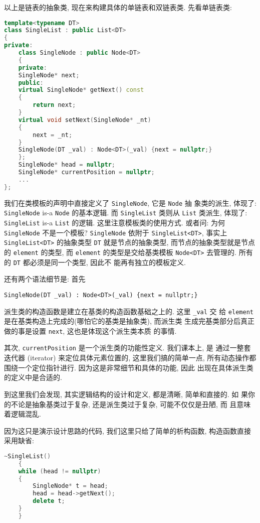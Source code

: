\documentclass[a4paper]{ctexart}
\theoremstyle{definition}
\theoremstyle{definition}
\begin{document}
以上是链表的抽象类, 现在来构建具体的单链表和双链表类. 先看单链表类:

\begin{lstlisting}[language=C++]
template<typename DT>
class SingleList : public List<DT>
{
private:
    class SingleNode : public Node<DT>
    {
    private:
	SingleNode* next;
    public:
	virtual SingleNode* getNext() const
	{
	    return next;
	}
	virtual void setNext(SingleNode* _nt)
	{
	    next = _nt;
	}
	SingleNode(DT _val) : Node<DT>(_val) {next = nullptr;}
    };
    SingleNode* head = nullptr;
    SingleNode* currentPosition = nullptr;
    ...
};
\end{lstlisting}

我们在类模板的声明中直接定义了 \verb|SingleNode|, 它是 \verb|Node| 抽
象类的派生, 体现了: \verb|SingleNode| is-a \verb|Node| 的基本逻辑. 而
\verb|SingleList| 类则从 \verb|List| 类派生, 体现了: \verb|SingleList|
is-a \verb|List| 的逻辑. 这里注意模板类的使用方式. 或者问: 为何
\verb|SingleNode| 不是一个模板? \verb|SingleNode| 依附于
\verb|SingleList<DT>|, 事实上 \verb|SingleList<DT>| 的抽象类型
\verb|DT| 就是节点的抽象类型, 而节点的抽象类型就是节点的
\verb|element| 的类型, 而 \verb|element| 的类型是交给基类模板
\verb|Node<DT>| 去管理的. 所有的 \verb|DT| 都必须是同一个类型, 因此不
能再有独立的模板定义. 

还有两个语法细节是: 首先
\begin{verbatim}
SingleNode(DT _val) : Node<DT>(_val) {next = nullptr;}
\end{verbatim}

派生类的构造函数是建立在基类的构造函数基础之上的. 这里 \verb|_val| 交
给 \verb|element| 是在基类构造上完成的(哪怕它的基类是抽象类), 而派生类
生成完基类部分后真正做的事是设置 \verb|next|, 这也是体现这个派生类本质
的事情.

其次, \verb|currentPosition| 是一个派生类的功能性定义. 我们课本上, 是
通过一整套迭代器 (iterator) 来定位具体元素位置的, 这里我们搞的简单一点,
所有动态操作都围绕一个定位指针进行. 因为这是非常细节和具体的功能, 因此
出现在具体派生类的定义中是合适的. 

到这里我们会发现, 其实逻辑结构的设计和定义, 都是清晰, 简单和直接的. 如
果你的不论是抽象基类过于复杂, 还是派生类过于复杂, 可能不仅仅是丑陋, 而
且意味着逻辑混乱.

因为这只是演示设计思路的代码, 我们这里只给了简单的析构函数, 构造函数直接采用缺省:
\begin{lstlisting}[language=C++]
    ~SingleList()
    {
	while (head != nullptr)
	{
	    SingleNode* t = head;
	    head = head->getNext();
	    delete t;
	}
    }
\end{lstlisting}
\end{document}
